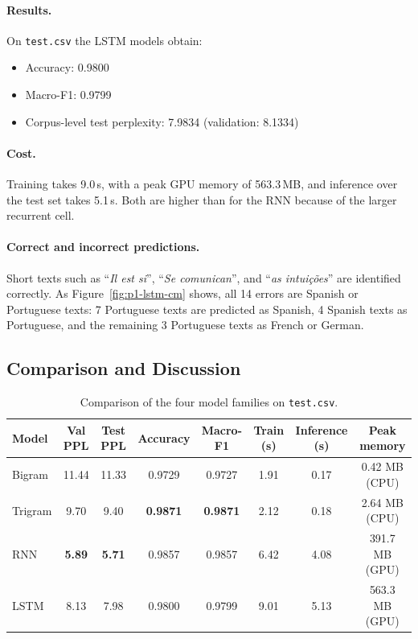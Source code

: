 \documentclass[11pt,a4paper]{article}
\begin{document}
\paragraph{Results.}
On \texttt{test.csv} the LSTM models obtain:
\begin{itemize}
    \item Accuracy: 0.9800
    \item Macro-F1: 0.9799
    \item Corpus-level test perplexity: 7.9834 (validation: 8.1334)
\end{itemize}

\paragraph{Cost.}
Training takes 9.0\,s, with a peak GPU memory of 563.3\,MB, and
inference over the test set takes 5.1\,s. Both are higher than for the
RNN because of the larger recurrent cell.

\paragraph{Correct and incorrect predictions.}
Short texts such as ``\emph{Il est si}'', ``\emph{Se comunican}'', and
``\emph{as intuições}'' are identified correctly. As
Figure~\ref{fig:p1-lstm-cm} shows, all 14 errors are Spanish or
Portuguese texts: 7 Portuguese texts are predicted as Spanish, 4 Spanish
texts as Portuguese, and the remaining 3 Portuguese texts as French or
German.


\subsection{Comparison and Discussion}

\begin{table}[H]
    \centering
    \caption{Comparison of the four model families on \texttt{test.csv}.}
    \label{tab:p1-summary}
    \small
    \begin{tabular}{lccccccc}
        \toprule
        Model & Val PPL & Test PPL & Accuracy & Macro-F1 & Train (s) & Inference (s) & Peak memory\\
        \midrule
        Bigram  & 11.44 & 11.33 & 0.9729 & 0.9727 & 1.91 & 0.17 & 0.42 MB (CPU)\\
        Trigram & 9.70  & 9.40  & \textbf{0.9871} & \textbf{0.9871} & 2.12 & 0.18 & 2.64 MB (CPU)\\
        RNN     & \textbf{5.89} & \textbf{5.71} & 0.9857 & 0.9857 & 6.42 & 4.08 & 391.7 MB (GPU)\\
        LSTM    & 8.13  & 7.98  & 0.9800 & 0.9799 & 9.01 & 5.13 & 563.3 MB (GPU)\\
        \bottomrule
    \end{tabular}
\end{table}
\end{document}
